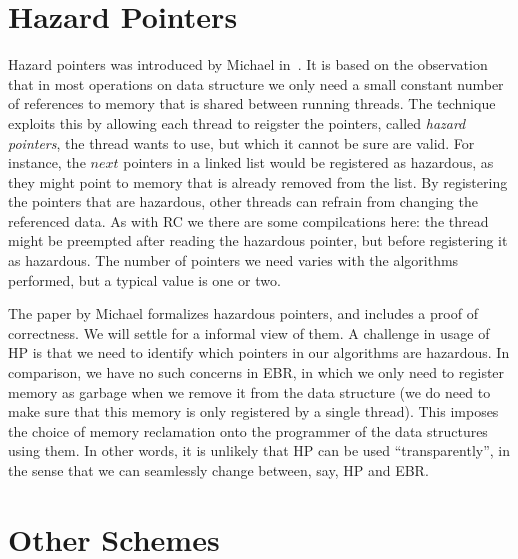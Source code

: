 \documentclass[b5paper,twoside]{report}
\begin{document}


\section{Hazard Pointers}

Hazard pointers was introduced by Michael in~\cite{michael2004hazard}.  It is
based on the observation that in most operations on data structure we only need
a small constant number of references to memory that is shared between running
threads. The technique exploits this by allowing each thread to reigster the
pointers, called \emph{hazard pointers}, the thread wants to use, but which it
cannot be sure are valid.  For instance, the $next$ pointers in a linked list
would be registered as hazardous, as they might point to memory that is already
removed from the list.  By registering the pointers that are hazardous, other
threads can refrain from changing the referenced data.  As with RC we there are
some compilcations here: the thread might be preempted after reading the
hazardous pointer, but before registering it as hazardous.  The number of
pointers we need varies with the algorithms performed, but a typical value is
one or two.

 The
paper by Michael formalizes hazardous pointers, and includes a proof of
correctness. We will settle for a informal view of them.  A challenge in usage
of HP is that we need to identify which pointers in our algorithms are
hazardous. In comparison, we have no such concerns in EBR, in which we only
need to register memory as garbage when we remove it from the data structure
(we do need to make sure that this memory is only registered by a single
thread).  This imposes the choice of memory reclamation onto the programmer of
the data structures using them. In other words, it is unlikely that HP can be
used ``transparently'', in the sense that we can seamlessly change between,
say, HP and EBR\@.



\section{Other Schemes}
\end{document}
